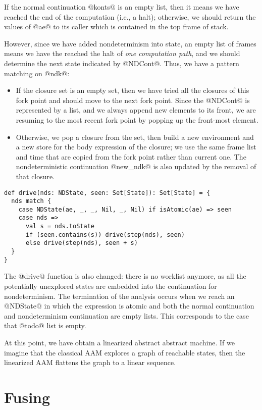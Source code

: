 \documentclass[acmsmall,review,anonymous]{acmart}\settopmatter{printfolios=true,printccs=false,printacmref=false}
\begin{document}
If the normal continuation @konts@ is an empty list, then it means we have reached
the end of the computation (i.e., a halt); otherwise, we should return the values of @ae@ to its caller which is contained in the top frame of stack.

However, since we have added nondeterminism into state, an empty list of frames means
we have the reached the halt of \textit{one computation path}, and we should
determine the next state indicated by @NDCont@.
Thus, we have a pattern matching on @ndk@:
\begin{itemize}
  \item If the closure set is an empty set,
then we have tried all the closures of this fork point and should move to the
next fork point. Since the @NDCont@ is represented by a list, and we always
append new elements to its front, we are resuming to the most recent fork point by
popping up the front-most element.
  \item Otherwise, we pop a closure from the set, then build a new
environment and a new store for the body expression of the closure;
we use the same frame list and time that are copied from the fork point rather
than current one.
The nondeterministic continuation @new_ndk@ is also updated by the removal of that closure.
\end{itemize}

\begin{lstlisting}
def drive(nds: NDState, seen: Set[State]): Set[State] = {
  nds match {
    case NDState(ae, _, _, Nil, _, Nil) if isAtomic(ae) => seen
    case nds =>
      val s = nds.toState
      if (seen.contains(s)) drive(step(nds), seen)
      else drive(step(nds), seen + s)
  }
}
\end{lstlisting}

The @drive@ function is also changed: there is no worklist anymore, as all the
potentially unexplored states are embedded into the continuation for
nondeterminism.
The termination of the analysis occurs when we reach an @NDState@ in which the expression
is atomic and both the normal continuation and nondeterminism continuation are
empty lists. This corresponds to the case that @todo@ list is empty.

At this point, we have obtain a linearized abstract abstract machine. If we imagine that the
classical AAM explores a graph of reachable states, then the linearized AAM flattens the
graph to a linear sequence.

\section{Fusing} \label{fusing}
\end{document}
